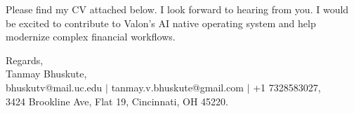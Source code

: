 \documentclass[11pt]{letter}
\begin{document}
\begin{letter}{}
Please find my CV attached below. I look forward to hearing from you. I would be excited to contribute to Valon's AI native operating system and help modernize complex financial workflows.

{\setlength{\parskip}{0pt}
Regards,\\
Tanmay Bhuskute,\\
bhuskutv@mail.uc.edu $\mid$ tanmay.v.bhuskute@gmail.com $\mid$ +1 7328583027,\\
3424 Brookline Ave, Flat 19, Cincinnati, OH 45220.
}

\end{letter}
\end{document}
